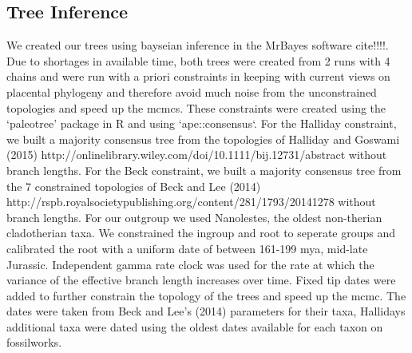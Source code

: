 \documentclass[11pt,letterpaper]{article}
\begin{document}
\newpage

\subsection{Tree Inference}

We created our trees using bayseian inference in the MrBayes software cite!!!!.
Due to shortages in available time, both trees were created from 2 runs with 4 chains and were run with a priori constraints in keeping with current views on placental phylogeny and therefore avoid much noise from the unconstrained topologies and speed up the mcmcs. %
These constraints were created using the `paleotree' package in R and using `ape::consensus`.
For the Halliday constraint, we built a majority consensus tree from the topologies of Halliday and Goswami (2015) http://onlinelibrary.wiley.com/doi/10.1111/bij.12731/abstract %
without branch lengths.
For the Beck constraint, we built a majority consensus tree from the 7 constrained topologies of Beck and Lee (2014) http://rspb.royalsocietypublishing.org/content/281/1793/20141278 without branch lengths.
For our outgroup we used Nanolestes, %
 the oldest non-therian cladotherian taxa. %
 We constrained the ingroup and root to seperate groups and calibrated the root with a uniform date of between 161-199 mya, %
  mid-late Jurassic.
 Independent gamma rate clock was used for the rate at which the variance of the effective branch length increases over time. %
 Fixed tip dates were added to further constrain the topology of the trees and speed up the mcmc. %
 The dates were taken from Beck and Lee's (2014) parameters for their taxa, Hallidays additional taxa were dated using the oldest dates available for each taxon on fossilworks. %
\end{document}
